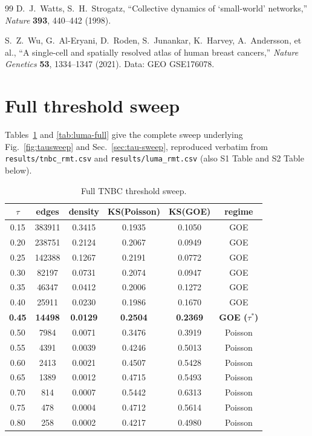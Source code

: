 \documentclass[11pt]{article}
\begin{document}
\begin{thebibliography}{99}
D.~J.~Watts, S.~H.~Strogatz,
\newblock ``Collective dynamics of `small-world' networks,''
\newblock \emph{Nature} \textbf{393}, 440--442 (1998).

S.~Z.~Wu, G.~Al-Eryani, D.~Roden, S.~Junankar, K.~Harvey, A.~Andersson, et al.,
\newblock ``A single-cell and spatially resolved atlas of human breast cancers,''
\newblock \emph{Nature Genetics} \textbf{53}, 1334--1347 (2021). Data: GEO GSE176078.

\end{thebibliography}

\appendix
\section{Full threshold sweep}

Tables~\ref{tab:tnbc-full} and \ref{tab:luma-full} give the complete
sweep underlying Fig.~\ref{fig:tausweep} and Sec.~\ref{sec:tau-sweep},
reproduced verbatim from \texttt{results/tnbc\_rmt.csv} and
\texttt{results/luma\_rmt.csv} (also S1 Table and S2 Table below).

\begin{table}[h]
\centering
\caption{Full TNBC threshold sweep.}
\label{tab:tnbc-full}
\begin{tabular}{cccccc}
\toprule
$\tau$ & edges & density & KS(Poisson) & KS(GOE) & regime \\
\midrule
0.15 & 383911 & 0.3415 & 0.1935 & 0.1050 & GOE \\
0.20 & 238751 & 0.2124 & 0.2067 & 0.0949 & GOE \\
0.25 & 142388 & 0.1267 & 0.2191 & 0.0772 & GOE \\
0.30 & 82197  & 0.0731 & 0.2074 & 0.0947 & GOE \\
0.35 & 46347  & 0.0412 & 0.2006 & 0.1272 & GOE \\
0.40 & 25911  & 0.0230 & 0.1986 & 0.1670 & GOE \\
\textbf{0.45} & \textbf{14498} & \textbf{0.0129} & \textbf{0.2504} & \textbf{0.2369} & \textbf{GOE ($\tau^*$)} \\
0.50 & 7984   & 0.0071 & 0.3476 & 0.3919 & Poisson \\
0.55 & 4391   & 0.0039 & 0.4246 & 0.5013 & Poisson \\
0.60 & 2413   & 0.0021 & 0.4507 & 0.5428 & Poisson \\
0.65 & 1389   & 0.0012 & 0.4715 & 0.5493 & Poisson \\
0.70 & 814    & 0.0007 & 0.5442 & 0.6313 & Poisson \\
0.75 & 478    & 0.0004 & 0.4712 & 0.5614 & Poisson \\
0.80 & 258    & 0.0002 & 0.4217 & 0.4980 & Poisson \\
\bottomrule
\end{tabular}
\end{table}
\end{document}
